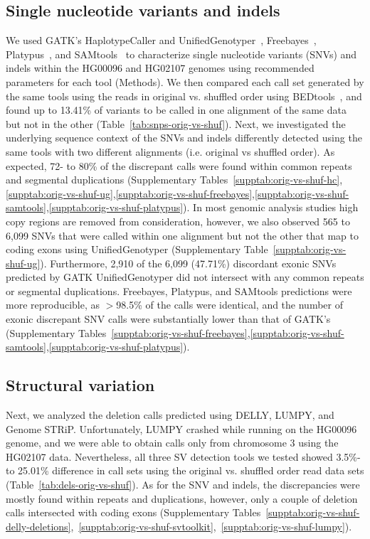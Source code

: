 \documentclass{bioinfo}
\begin{document}
\begin{methods}
\subsection*{Single nucleotide variants and indels}
We used GATK's HaplotypeCaller and UnifiedGenotyper~\citep{DePristo2011}, Freebayes~\citep{Garrison2012}, Platypus~\citep{Rimmer2014}, and SAMtools~\citep{Li2009b} to characterize
single nucleotide variants (SNVs) and indels within the HG00096 and HG02107 genomes using recommended parameters for each tool (Methods). We then compared each call set generated by the same tools using the reads in original vs. shuffled order using BEDtools~\citep{Quinlan2010a}, and found up to 13.41\% of variants to be called in one alignment of the same data but not in the other (Table~\ref{tab:snps-orig-vs-shuf}).
Next, we investigated the underlying sequence context of the SNVs 
and indels differently detected using the same tools with two different alignments (i.e. original vs shuffled order). 
As expected, 72- to 80\% of the discrepant calls were found within common repeats and segmental duplications (Supplementary Tables~\ref{supptab:orig-vs-shuf-hc},\ref{supptab:orig-vs-shuf-ug},\ref{supptab:orig-vs-shuf-freebayes},\ref{supptab:orig-vs-shuf-samtools},\ref{supptab:orig-vs-shuf-platypus}). 
In most genomic analysis studies high copy regions are removed from consideration, however, we also observed 565 to 6,099 
SNVs that were called within one alignment but not the other that map to coding exons using UnifiedGenotyper (Supplementary Table~\ref{supptab:orig-vs-shuf-ug}). 
Furthermore, 2,910 of the 6,099 (47.71\%) discordant exonic SNVs predicted by GATK UnifiedGenotyper did not intersect with any common repeats or segmental duplications.
Freebayes, Platypus, and SAMtools predictions were more reproducible, as $>$98.5\% of the calls were identical, and the number of exonic discrepant SNV calls were substantially lower than
that of GATK's (Supplementary Tables~\ref{supptab:orig-vs-shuf-freebayes},\ref{supptab:orig-vs-shuf-samtools},\ref{supptab:orig-vs-shuf-platypus}). 

\subsection*{Structural variation}
Next, we analyzed the deletion calls predicted using DELLY, LUMPY, and Genome STRiP. Unfortunately, LUMPY crashed while running on the HG00096 genome, and we were able to obtain calls only from chromosome 3 using the HG02107 data. Nevertheless, all three SV detection tools we tested showed 3.5\%- to 25.01\% difference in call sets using the original vs. shuffled order read data sets (Table~\ref{tab:dels-orig-vs-shuf}). As for the SNV and indels, the discrepancies were mostly found within repeats and duplications, however, only a couple of deletion calls intersected with coding exons (Supplementary Tables~\ref{supptab:orig-vs-shuf-delly-deletions},~\ref{supptab:orig-vs-shuf-svtoolkit},~\ref{supptab:orig-vs-shuf-lumpy}). 


\end{methods}
\end{document}
